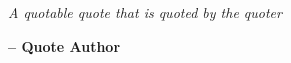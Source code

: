 \chapter*{}
\vspace*{\fill}

\begin{center}
\begin{minipage}{0.5\textwidth}
\itshape
    A quotable quote
    that is quoted
    by the quoter
\end{minipage}
\end{center}
\hspace*{0.75\textwidth} {\bfseries -- Quote Author}


\vspace*{\fill}
\newpage

